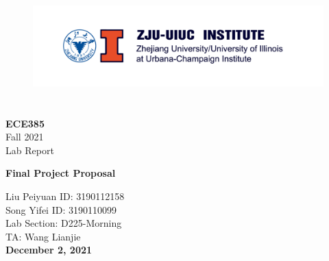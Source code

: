 \documentclass[a4paper]{article}
\begin{document}
\begin{titlepage}
	\begin{center}
		\begin{figure}[htb!]
            \centering
            \includegraphics[height=4.5cm]{images/zjuuiuc.png}
		\end{figure}
        \vspace{10pt} %
        
        \LARGE{\textbf{ECE385}}\\
        \vspace{5pt}
        \Large{Fall 2021}\\
        \vspace{5pt}
        \Large{Lab Report}\\
        
        \vspace{100pt}
        
        \huge{\textbf{Final Project Proposal}}\\ 
        
        \vspace{150pt}
        
        
        \vspace{10pt} 
        \hfill Liu Peiyuan \hspace{10pt} ID: 3190112158\\
        \vspace{10pt}
        \hfill Song Yifei \hspace{10pt} ID: 3190110099\\
        \vspace{10pt}
        \hfill Lab Section: \hspace{10pt} D225-Morning\\
        \vspace{10pt}
        \hfill TA: \hspace{10pt} Wang Lianjie\\
        \vspace{\fill}
        \LARGE \bf{December 2, 2021}
	\end{center}
\end{titlepage}
\end{document}

